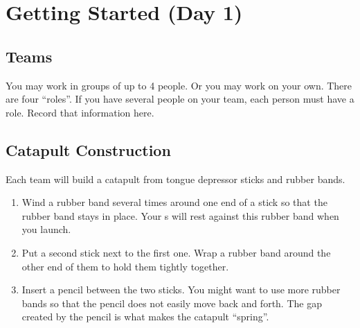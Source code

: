 \section{Getting Started (Day 1)}



\subsection{Teams}

You may work in groups of up to 4 people. Or you may work on your own.
There are four ``roles''. If you have several people on your team, 
each person must have a role. Record that information here.


\subsection{Catapult Construction}

Each team will build a catapult from tongue depressor sticks and rubber bands.
\begin{enumerate}
    \item Wind a rubber band several times around one end of a stick 
        so that the rubber band stays in place.
        Your \mymm{}s will rest against this rubber band when you launch.
    \item Put a second stick next to the first one. Wrap a rubber band around the other end of them
        to hold them tightly together. 
    \item Insert a pencil between the two sticks. 
        You might want to use more rubber bands so that the pencil 
        does not easily move back and forth.
        The gap created by the pencil is what makes the catapult ``spring''.
\end{enumerate}

